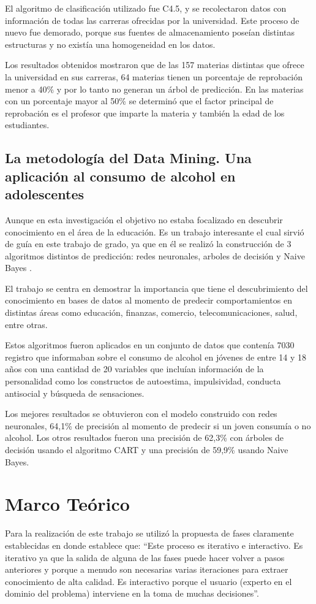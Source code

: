 El algoritmo de clasificación utilizado fue C4.5, y se recolectaron datos con información de todas las carreras ofrecidas por la universidad. Este proceso de nuevo fue demorado, porque sus fuentes de almacenamiento poseían distintas estructuras y no existía una homogeneidad en los datos.

Los resultados obtenidos mostraron que de las 157 materias distintas que ofrece la universidad en sus carreras, 64 materias tienen un porcentaje de reprobación menor a 40\% y por lo tanto no generan un árbol de predicción. En las materias con un porcentaje mayor al 50\% se determinó que el factor principal de reprobación es el profesor que imparte la materia y también la edad de los estudiantes.
\subsection{La metodología del Data Mining. Una aplicación al consumo de alcohol en adolescentes \cite{key-150}}
Aunque en esta investigación el objetivo no estaba focalizado en descubrir conocimiento en el área de la educación. Es un trabajo interesante el cual sirvió de guía en este trabajo de grado, ya que en él se realizó la construcción de 3 algoritmos distintos de predicción: redes neuronales, arboles de decisión y Naive Bayes \cite{key-50}.

El trabajo se centra en demostrar la importancia que tiene el descubrimiento del conocimiento en bases de datos al momento de predecir comportamientos en distintas áreas como educación, finanzas, comercio, telecomunicaciones, salud, entre otras.

Estos algoritmos fueron aplicados en un conjunto de datos que contenía 7030 registro que informaban sobre el consumo de alcohol en jóvenes de entre 14 y 18 años con una cantidad de 20 variables que incluían información de la personalidad como los constructos de autoestima, impulsividad, conducta antisocial y búsqueda de sensaciones.

Los mejores resultados se obtuvieron con el modelo construido con redes neuronales, 64,1\% de precisión al momento de predecir si un joven consumía o no alcohol. Los otros resultados fueron una precisión de 62,3\% con árboles de decisión usando el algoritmo CART \cite{key-50} y una precisión de 59,9\% usando Naive Bayes.
\section{Marco Teórico}
Para la realización de este trabajo se utilizó la propuesta de fases claramente establecidas en \cite{key-50} donde establece que: ``Este proceso es iterativo e interactivo. Es iterativo ya que la salida de alguna de las fases puede hacer volver a pasos anteriores y porque a menudo son necesarias varias iteraciones para extraer conocimiento de alta calidad. Es interactivo porque el usuario (experto en el dominio del problema) interviene en la toma de muchas decisiones''.

